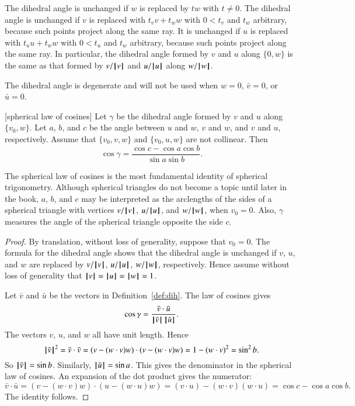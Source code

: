 The dihedral angle is unchanged if $w$ is replaced by $t w$ with
$t\ne0$. The dihedral angle is unchanged if $v$ is replaced with
$t_v v + t_w w$ with $0 < t_v$ and $t_w$ arbitrary, because such points project along the same ray.  
It is unchanged if
$u$ is replaced with $t_u u + t_w w$ with $0 < t_u$ and $t_w$
arbitrary, because such points project along the same ray.  In particular, the dihedral angle formed by $v$ and
$u$ along $\{0,w\}$ is the same as that formed by $v/{{\hskip0.1em|\hskip-0.15em|\hskip0.1em}v{\hskip0.1em|\hskip-0.15em|\hskip0.1em}}$ and
$u/{{\hskip0.1em|\hskip-0.15em|\hskip0.1em}u{\hskip0.1em|\hskip-0.15em|\hskip0.1em}}$ along $w/{{\hskip0.1em|\hskip-0.15em|\hskip0.1em}w{\hskip0.1em|\hskip-0.15em|\hskip0.1em}}$.

The dihedral angle is degenerate and will not be used when $w =
0$, $\bar v = 0$, or $\bar u = 0$.




\begin{lemma}[spherical law of cosines]\label{lemma:sloc}
Let $\gamma$ be the dihedral angle formed by $v$ and $u$ along
$\{v_0,w\}$.  Let $a$, $b$, and $c$ be the
angle between $u$ and $w$, $v$ and $w$, and $v$ and
$u$, respectively. %
Assume that $\{v_0,v,w\}$ and $\{v_0,u,w\}$ are not collinear.
Then
    $$\cos\gamma = \frac{\cos c - \cos a \cos b}{\sin a\sin b}.$$
\end{lemma}
%
%
%

The spherical law of cosines is the most fundamental identity of spherical trigonometry.    Although  spherical
triangles do not become a topic until later in the book, $a$, $b$, and $c$ may be interpreted as
the arclengths of the sides of a spherical triangle with
vertices $v/{{\hskip0.1em|\hskip-0.15em|\hskip0.1em}v{\hskip0.1em|\hskip-0.15em|\hskip0.1em}}$, $u/{{\hskip0.1em|\hskip-0.15em|\hskip0.1em}u{\hskip0.1em|\hskip-0.15em|\hskip0.1em}}$, and $w/{{\hskip0.1em|\hskip-0.15em|\hskip0.1em}w{\hskip0.1em|\hskip-0.15em|\hskip0.1em}}$,  when $v_0=0$.  Also,
$\gamma$ measures the angle of the spherical triangle opposite the
side $c$.
%
%


\begin{proof}  By translation, without loss of generality, suppose that $v_0=0$.  
The formula for the dihedral angle shows that the
dihedral angle is unchanged if $v$, $u$, and $w$ are replaced
by $v/{{\hskip0.1em|\hskip-0.15em|\hskip0.1em}v{\hskip0.1em|\hskip-0.15em|\hskip0.1em}}$, $u/{{\hskip0.1em|\hskip-0.15em|\hskip0.1em}u{\hskip0.1em|\hskip-0.15em|\hskip0.1em}}$, $w/{{\hskip0.1em|\hskip-0.15em|\hskip0.1em}w{\hskip0.1em|\hskip-0.15em|\hskip0.1em}}$, respectively.  Hence assume without
loss of generality that ${{\hskip0.1em|\hskip-0.15em|\hskip0.1em}v{\hskip0.1em|\hskip-0.15em|\hskip0.1em}}={{\hskip0.1em|\hskip-0.15em|\hskip0.1em}u{\hskip0.1em|\hskip-0.15em|\hskip0.1em}}={{\hskip0.1em|\hskip-0.15em|\hskip0.1em}w{\hskip0.1em|\hskip-0.15em|\hskip0.1em}}=1$.

Let $\bar v$ and $\bar u$ be the vectors in Definition~\ref{def:dih}.
The law of cosines gives
        $$\cos\gamma = \frac{\bar v\cdot \bar u}{{{\hskip0.1em|\hskip-0.15em|\hskip0.1em}\bar v{\hskip0.1em|\hskip-0.15em|\hskip0.1em}}\,{{\hskip0.1em|\hskip-0.15em|\hskip0.1em}\bar u{\hskip0.1em|\hskip-0.15em|\hskip0.1em}}}.$$
The vectors $v$, $u$, and $w$ all have unit length.  Hence
        $$
        {{\hskip0.1em|\hskip-0.15em|\hskip0.1em}\bar v{\hskip0.1em|\hskip-0.15em|\hskip0.1em}}^2 = \bar v\cdot \bar v =
        (v - (w\cdot v)w)\cdot (v - (w\cdot v) w) =
        1 - (w\cdot v)^2 = \sin^2 b.
        $$
So ${{\hskip0.1em|\hskip-0.15em|\hskip0.1em}\bar v{\hskip0.1em|\hskip-0.15em|\hskip0.1em}} =\sin b$. Similarly, ${{\hskip0.1em|\hskip-0.15em|\hskip0.1em}\bar u{\hskip0.1em|\hskip-0.15em|\hskip0.1em}} = \sin a$.  This gives
the denominator in the spherical law of cosines.  An expansion of the dot product
gives the numerator:
    $$
    \bar v\cdot \bar u = (v - (w\cdot v) w)\cdot (u - (w\cdot u) w)
    = (v\cdot u) - (w\cdot v) (w\cdot u) = \cos c - \cos
    a \cos b.
    $$
The identity follows.
\end{proof}


